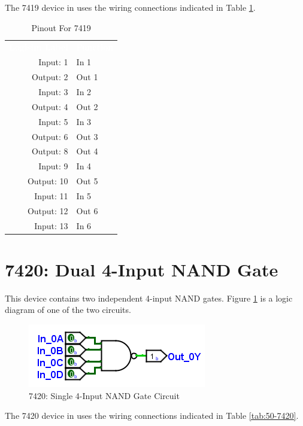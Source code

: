 The 7419 device in \LE uses the wiring connections indicated in Table \ref{tab:50-7419}.

\begin{table}[H]
	\sffamily
	\newcommand{\head}[1]{\textcolor{white}{\textbf{#1}}}		
	\begin{center}
		\begin{tabular}{rl} 
			\rowcolor{black!75}
			\head{Logisim Label} & \head{Function} \\
			Input: 1   & In 1  \\
			Output: 2  & Out 1  \\
			Input: 3   & In 2 \\
			Output: 4  & Out 2  \\
			Input: 5   & In 3  \\
			Output: 6  & Out 3 \\
			Output: 8  & Out 4  \\
			Input: 9   & In 4  \\
			Output: 10 & Out 5  \\
			Input: 11  & In 5  \\
			Output: 12 & Out 6 \\
			Input: 13  & In 6  \\
		\end{tabular}
	\end{center}
	\caption{Pinout For 7419}
	\label{tab:50-7419}
\end{table}

\section{7420: Dual 4-Input NAND Gate}

This device contains two independent 4-input NAND gates. Figure \ref{fig:50-7420} is a logic diagram of one of the two circuits.

\begin{figure}[H]
	\centering
	\includegraphics{gfx/50-7413}
	\caption{7420: Single 4-Input NAND Gate Circuit}
	\label{fig:50-7420}
\end{figure}

The 7420 device in \LE uses the wiring connections indicated in Table \ref{tab:50-7420}.

